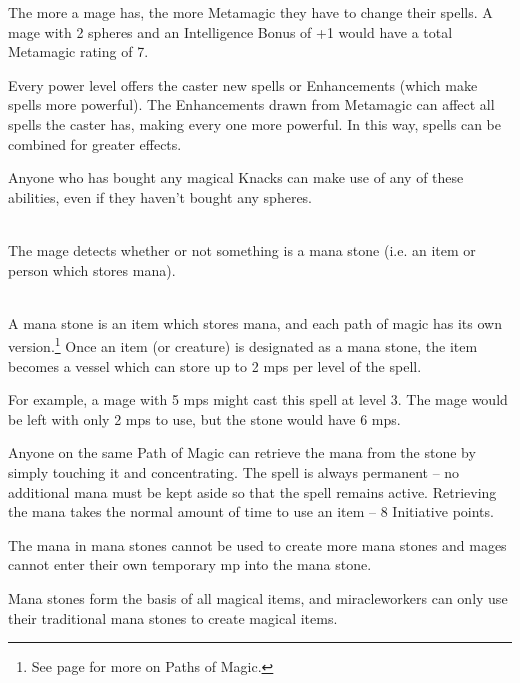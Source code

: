 \begin{multicols}{2}


\noindent
The more  a mage has, the more Metamagic they have to change their spells.
A mage with 2 spheres and an Intelligence Bonus of +1 would have a total Metamagic rating of 7.

Every power level offers the caster new spells or Enhancements (which make spells more powerful).
The Enhancements drawn from Metamagic can affect all spells the caster has, making every one more powerful.
In this way, spells can be combined for greater effects.

Anyone who has bought any magical Knacks can make use of any of these abilities, even if they haven't bought any spheres.

\spelllevel

\\
The mage detects whether or not something is a mana stone (i.e. an item or person which stores mana).

\\
A mana stone is an item which stores mana, and each path of magic has its own version.\footnote{See page \pageref{magic_paths} for more on Paths of Magic.}
Once an item (or creature) is designated as a mana stone, the item becomes a vessel which can store up to 2 \glspl{mp} per level of the spell.

For example, a mage with 5 \glspl{mp} might cast this spell at level 3.
The mage would be left with only 2 \glspl{mp} to use, but the stone would have 6 \glspl{mp}.

Anyone on the same Path of Magic can retrieve the mana from the stone by simply touching it and concentrating.
The spell is always permanent -- no additional mana must be kept aside so that the spell remains active.
Retrieving the mana takes the normal amount of time to use an item -- 8 Initiative points.

The mana in mana stones cannot be used to create more mana stones and mages cannot enter their own temporary \gls{mp} into the mana stone.

Mana stones form the basis of all magical items, and \glspl{miracleworker} can only use their traditional mana stones to create magical items.


\end{multicols}
